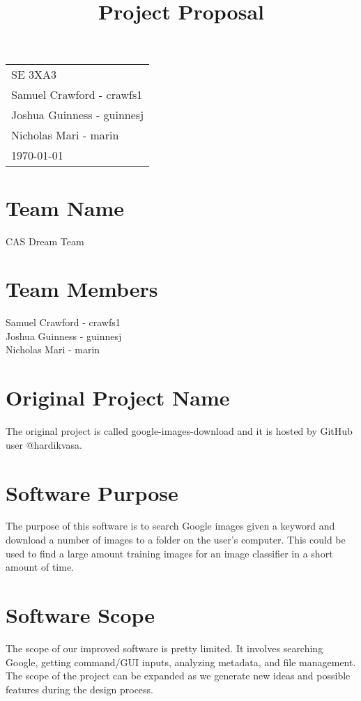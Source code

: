 \documentclass[12pt]{article}
\title{Project Proposal}
\date{}
\begin{document}
\noindent
\begin{tabular}[c]{@{}l@{}}
SE 3XA3\\
Samuel Crawford - crawfs1\\
Joshua Guinness - guinnesj\\
Nicholas Mari - marin\\
\today
\end{tabular}

{
\let\newpage\relax
\maketitle
}
 
\section* {Team Name}

CAS Dream Team

\section* {Team Members}

Samuel Crawford - crawfs1\\
Joshua Guinness - guinnesj\\
Nicholas Mari - marin\\

\section* {Original Project Name}

The original project is called google-images-download and it is hosted by GitHub user @hardikvasa.

\section* {Software Purpose}

The purpose of this software is to search Google images given a keyword and download a number of images to a folder on the user’s computer. This could be used to find a large amount training images for an image classifier in a short amount of time.

\section* {Software Scope}

The scope of our improved software is pretty limited. It involves searching Google, getting command/GUI inputs, analyzing metadata, and file management. The scope of the project can be expanded as we generate new ideas and possible features during the design process.
\end{document}
